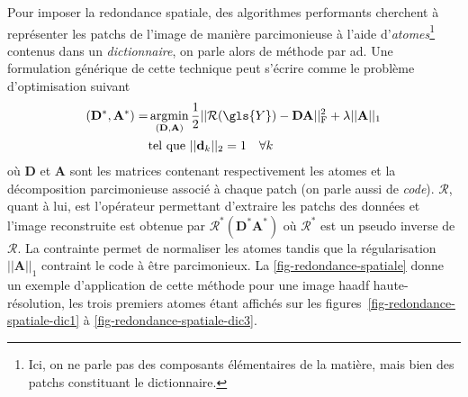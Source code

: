 Pour imposer la redondance spatiale, des algorithmes performants cherchent à représenter les patchs de l'image de manière parcimonieuse à l'aide d'\emph{atomes}\footnote{Ici, on ne parle pas des composants élémentaires de la matière, mais bien des patchs constituant le dictionnaire.} contenus dans un \emph{dictionnaire}, on parle alors de méthode par \acrfull{ad}. Une formulation générique de cette technique peut s'écrire comme le problème d'optimisation suivant~\cite{mairal2009online}
\begin{equation}
    \begin{aligned}
    (\mathbf{D}^*,\mathbf{A}^*) = &\argmin_{(\mathbf{D}, \mathbf{A})}
    \frac{1}{2} \frobnorm{ \mathcal{R}(\gls{Y}) - \mathbf{D A}} + \lambda  || \mathbf{A} ||_1\\
    &\text{tel que } || \mathbf{d}_k ||_2 = 1 \quad \forall k\\
    \end{aligned}
\end{equation}
où $\mathbf{D}$ et $\mathbf{A}$ sont les matrices contenant respectivement les atomes et la décomposition parcimonieuse associé à chaque patch (on parle aussi de \emph{code}). $\mathcal{R}$, quant à lui, est l'opérateur permettant d'extraire les patchs des données et l'image reconstruite est obtenue par $\mathcal{R}^*(\mathbf{D}^*\mathbf{A}^*)$ où $\mathcal{R}^*$ est un pseudo inverse de $\mathcal{R}$. La contrainte permet de normaliser les atomes tandis que la régularisation $|| \mathbf{A} ||_1$ contraint le code à être parcimonieux. 
%
La \cref{fig-redondance-spatiale} donne un exemple d'application de cette méthode pour une image \gls{haadf} haute-résolution, les trois premiers atomes étant affichés sur les figures~\ref{fig-redondance-spatiale-dic1} à \ref{fig-redondance-spatiale-dic3}.
%

